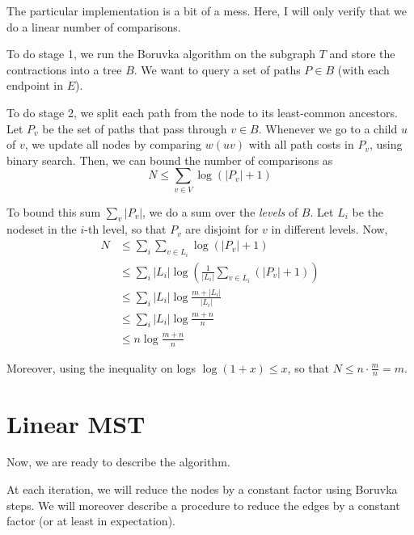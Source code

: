 \documentclass{article}
\newcommand{\abs}[1]{| #1 |}
\begin{document}
The particular implementation is a bit of a mess.
Here, I will only verify that we do a linear number of comparisons.

To do stage 1, we run the Boruvka algorithm on the subgraph $T$ and store the contractions into a tree $B$.
We want to query a set of paths $P \in B$ (with each endpoint in $E$).

To do stage 2, we split each path from the node to its least-common ancestors.
Let $P_v$ be the set of paths that pass through $v \in B$.
Whenever we go to a child $u$ of $v$, we update all nodes by comparing $w(uv)$ with all path costs in $P_v$, using binary search.
Then, we can bound the number of comparisons as
$$
    N  \le \sum_{v \in V} \log( \abs{P_v} + 1)
$$

To bound this sum $\sum_v \abs{P_v}$, we do a sum over the \emph{levels} of $B$.
Let $L_i$ be the nodeset in the $i$-th level, so that $P_v$ are disjoint for $v$ in different levels.
Now,
\begin{align*}
    N & \le \sum_{i} \sum_{v \in L_i} \log( \abs{P_v} + 1)                                  \\
      & \le \sum_{i} \abs{L_i} \log( \frac{1}{\abs{L_i}} \sum_{v \in L_i} (\abs{P_v} + 1) ) \\
      & \le \sum_{i} \abs{L_i} \log \frac{m + \abs{L_i}}{\abs{L_i}}                         \\
      & \le \sum_{i} \abs{L_i} \log \frac{m + n}{n}                                         \\
      & \le n \log \frac{m + n}{n}
\end{align*}

Moreover, using the inequality on logs $\log(1 + x) \le x$, so that $ N \le n \cdot \frac{m}{n} = m $.

\section{Linear MST}

Now, we are ready to describe the algorithm.

At each iteration, we will reduce the nodes by a constant factor using Boruvka steps.
We will moreover describe a procedure to reduce the edges by a constant factor (or at least in expectation).


\end{document}
